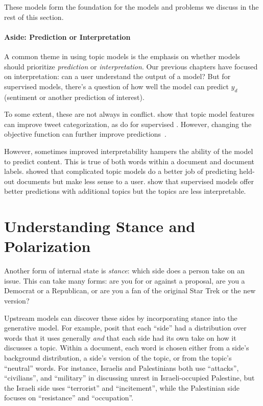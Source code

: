 These models form the foundation for the models and problems we
discuss in the rest of this section.

\paragraph{Aside: Prediction or Interpretation}

A common theme in using topic models is the emphasis on whether models
should prioritize \emph{prediction} or \emph{interpretation}.  Our
previous chapters have focused on interpretation: can a user
understand the output of a model?  But for supervised models, there's
a question of how well the model can predict $y_d$ (sentiment or
another prediction of interest).  

To some extent, these are not always in conflict.  \citet{ramage-10b}
show that topic model features can improve tweet categorization, as
do \citet{blei-07b} for supervised .  However, changing the
objective function can further improve predictions~\citep{zhu-09}.

However, sometimes improved interpretability hampers the ability of
the model to predict content.  This is true of both words within a
document and document labels.  \citet{chang-09b} showed that
complicated topic models do a better job of predicting held-out
documents but make less sense to a user.  \citet{Nguyen-15:anchor}
show that supervised models offer better predictions with additional
topics but the topics are less interpretable.

\section{Understanding Stance and Polarization}

Another form of internal state is \emph{stance}: which side does a
person take on an issue.  This can take many forms: are you for or
against a proposal, are you a Democrat or a Republican, or are you a
fan of the original Star Trek or the new version?

Upstream models can discover these sides by incorporating stance into
the generative model.  For example, \citet{paul-10} posit that each
``side'' had a distribution over words that it uses generally
\emph{and} that each side had its own take on how it discusses a
topic.  Within a document, each word is chosen either from a side's
background distribution, a side's version of the topic, or from the
topic's ``neutral'' words.  For instance, Israelis and Palestinians
both use ``attacks'', ``civilians'', and ``military'' in discussing
unrest in Israeli-occupied Palestine, but the Israeli side uses
``terrorist'' and ``incitement'', while the Palestinian side focuses
on ``resistance'' and ``occupation''.

